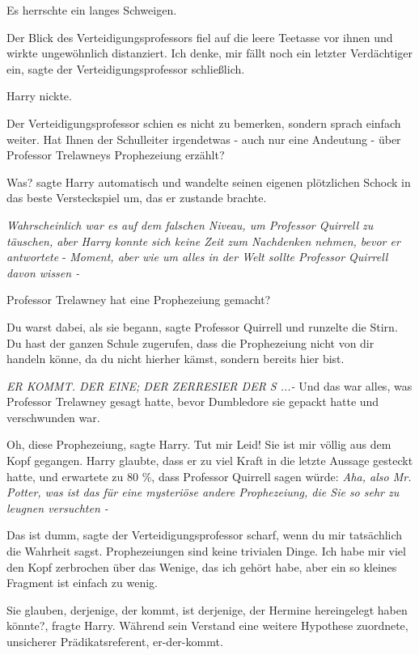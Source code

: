 Es herrschte ein langes Schweigen.

Der Blick des Verteidigungsprofessors fiel auf die leere Teetasse vor ihnen und
wirkte ungewöhnlich distanziert. \glqq{}Ich denke, mir fällt noch ein letzter
Verdächtiger ein\grqq{}, sagte der Verteidigungsprofessor schließlich.

Harry nickte.

Der Verteidigungsprofessor schien es nicht zu bemerken, sondern sprach einfach
weiter. \glqq{}Hat Ihnen der Schulleiter irgendetwas - auch nur eine Andeutung -
über Professor Trelawneys Prophezeiung erzählt?\grqq{}

\glqq{}Was?\grqq{} sagte Harry automatisch und wandelte seinen eigenen
plötzlichen Schock in das beste Versteckspiel um, das er zustande brachte.

\emph{Wahrscheinlich war es auf dem falschen Niveau, um Professor Quirrell zu
täuschen, aber Harry konnte sich keine Zeit zum Nachdenken nehmen, bevor er
antwortete} - \emph{Moment, aber wie um alles in der Welt sollte Professor
Quirrell davon wissen -}

\glqq{}Professor Trelawney hat eine Prophezeiung gemacht?\grqq{}

\glqq{}Du warst dabei, als sie begann\grqq{}, sagte Professor Quirrell und
runzelte die Stirn. \glqq{}Du hast der ganzen Schule zugerufen, dass die
Prophezeiung nicht von dir handeln könne, da du nicht hierher kämst, sondern
bereits hier bist.\grqq{}

\emph{ER KOMMT. DER EINE; DER ZERRESIER DER S ...-}
Und das war alles, was Professor Trelawney gesagt hatte, bevor Dumbledore sie
gepackt hatte und verschwunden war.

\glqq{}Oh, diese Prophezeiung\grqq{}, sagte Harry. \glqq{}Tut mir Leid! Sie ist
mir völlig aus dem Kopf gegangen.\grqq{} Harry glaubte, dass er zu viel Kraft in
die letzte Aussage gesteckt hatte, und erwartete zu 80 \%, dass Professor
Quirrell sagen würde: \emph{Aha, also Mr. Potter, was ist das für eine
mysteriöse andere Prophezeiung, die Sie so sehr zu leugnen versuchten -}

\glqq{}Das ist dumm\grqq{}, sagte der Verteidigungsprofessor scharf, \glqq{}wenn
du mir tatsächlich die Wahrheit sagst. Prophezeiungen sind keine trivialen
Dinge. Ich habe mir viel den Kopf zerbrochen über das Wenige, das ich gehört
habe, aber ein so kleines Fragment ist einfach zu wenig.\grqq{}

\glqq{}Sie glauben, derjenige, der kommt, ist derjenige, der Hermine hereingelegt
haben könnte?\grqq{}, fragte Harry. Während sein Verstand eine weitere Hypothese
zuordnete, unsicherer Prädikatsreferent, er-der-kommt.

